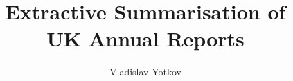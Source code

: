 \documentclass[12pt,BSc,wordcount,twoside]{third-rep}
\title{Extractive Summarisation of\\
  UK Annual Reports}
\author{Vladislav Yotkov}
\begin{document}
\dotitleandabstract

\tableofcontents



\listoffigures
\listoftables







%
\end{document}
